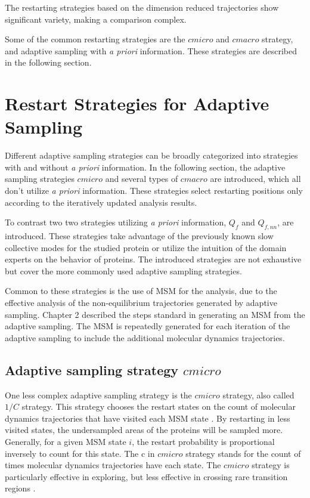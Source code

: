 The restarting strategies based on the dimension reduced trajectories show significant variety, making a comparison complex.

Some of the common restarting strategies are the $cmicro$ and $cmacro$ strategy, and adaptive sampling with \emph{a priori} information. These strategies are described in the following section. 

\section{\label{sec:restart-strategies}Restart Strategies for Adaptive Sampling}


Different adaptive sampling strategies can be broadly categorized into strategies with and without \emph{a priori} information. In the following section, the adaptive sampling strategies $cmicro$ and several types of $cmacro$ are introduced, which all don't utilize \emph{a priori} information. These strategies select restarting positions only according to the iteratively updated analysis results. 

To contrast two two strategies utilizing \emph{a priori} information, $Q_{f}$ and $Q_{f,nn}$, are introduced. These strategies take advantage of the previously known slow collective modes for the studied protein or utilize the intuition of the domain experts on the behavior of proteins. The introduced strategies are not exhaustive but cover the more commonly used adaptive sampling strategies. 

Common to these strategies is the use of MSM for the analysis, due to the effective analysis of the non-equilibrium trajectories generated by adaptive sampling. Chapter 2 described the steps standard in generating an MSM from the adaptive sampling. The MSM is repeatedly generated for each iteration of the adaptive sampling to include the additional molecular dynamics trajectories. 

\subsection{Adaptive sampling strategy $cmicro$}
One less complex adaptive sampling strategy is the $cmicro$ strategy, also called $1/C$ strategy. This strategy chooses the restart
states on the count of molecular dynamics trajectories that have visited each MSM state \cite{weber2011characterization, Fabritiis-2014, AdaptivePELE-Lecina2017,doerr2016htmd}.
By restarting in less visited states, the undersampled areas of the proteins will be sampled more. Generally, for a given MSM state $i$, the restart probability is proportional inversely to count for this state. The c in $cmicro$ strategy stands for the count of times molecular dynamics trajectories have each state. The $cmicro$ strategy is particularly effective in exploring, but less effective in crossing rare transition regions \cite{Adstrategies2018}.


